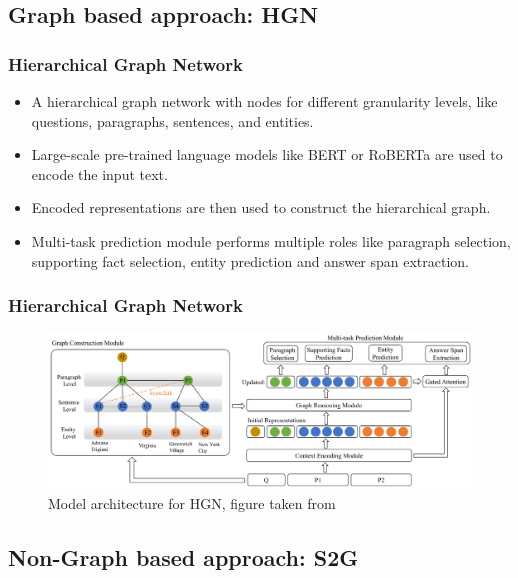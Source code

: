 \documentclass[10pt]{beamer}
\begin{document}
\subsection{Graph based approach: HGN}

\begin{frame}
  \frametitle{Hierarchical Graph Network}

  \begin{itemize}
    \item A hierarchical graph network with nodes for different granularity levels, like questions, paragraphs, sentences, and entities.
    \item Large-scale pre-trained language models like BERT or RoBERTa are used to encode the input text.
    \item Encoded representations are then used to construct the hierarchical graph.
    \item Multi-task prediction module performs multiple roles like paragraph selection, supporting fact selection, entity prediction and answer span extraction.
  \end{itemize}

\end{frame}

\begin{frame}
  \frametitle{Hierarchical Graph Network}

  \begin{figure}[t] %
    \centering
    \includegraphics[width=\linewidth]{fig/ext_fig/hgn_diagram.png} %
    \caption{Model architecture for HGN, figure taken from \cite{RN119}}
    \label{fig:sample_hotpotqa} %
  \end{figure}

\end{frame}

\subsection{Non-Graph based approach: S2G}
\end{document}
